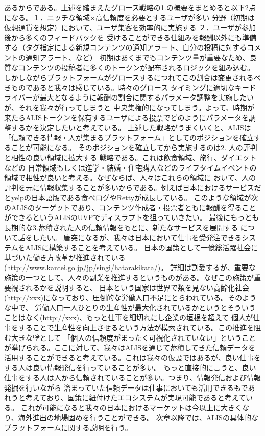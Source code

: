 \documentclass{jsarticle}
\begin{document}
あるからである。上述を踏まえたグロース戦略の1.の概要をまとめると以下2点になる。１．ニッチな領域×高信頼度を必要とするユーザが多い
分野（初期は仮想通貨を想定）において、ユーザ集客を効率的に実施する ２．ユーザが参加後から多くのフィードバックを
受けることができる仕組みを報酬以外にも準備する（タグ指定による新規コンテンツの通知アラート、自分の投稿に対するコメントの通知アラート、など）
初期はあくまでもコンテンツ量が重要なため、良質なコンテンツの投稿者に多くのトークンが配布されるロジックを組み込む。
しかしながらプラットフォームがグロースするにつれてこの割合は変更されるべきものであると我々は感じている。時々のグロース
タイミングに適切なキードライバーが最大となるように報酬の割合に関するパラメータ調整を実施したいが、それを我々が行ってしまうと
中央集権的になってしまう。よって、時期が来たらALISトークンを保有するユーザによる投票でどのようにパラメータを調整するかを決定したいと考えている。
上述した戦略がうまくいくと、ALISは「信頼できる情報・人が集まるプラットフォーム」としてのポジションを確立することが可能になる。
そのポジションを確立してから実施するのは2. 人の評判と相性の良い領域に拡大する 戦略である。これは飲食領域、旅行、ダイエットなどの
日常領域もしくは進学・結婚・住宅購入などのライフタイムイベントの領域で相性が良いと考える。なぜならば、人々はこれらの領域に
おいて、人の評判を元に情報収集することが多いからである。例えば日本におけるサービスだとyelpの日本語版である食べログやRettyが成長している。
このような領域が次のALISのターゲットであり、コンテンツ作成者・投票者ともに報酬を得ることができるというALISのUVPでディスラプトを狙っていきたい。
最後にもっとも長期的な3.蓄積された人の信頼情報をもとに、新たなサービスを展開する について話をしたい。
唐突になるが、我々は日本において仕事を受発注できるシステムをALISに構築することを考えている。
日本の国策として一億総活躍社会に基づいた働き方改革が推進されている(http://www.kantei.go.jp/jp/singi/hatarakikata/)。
詳細は割愛するが、重要な施策の一つとして、人々の副業を推進するというものがある。なぜこの施策が重要視されるかを説明すると、
日本という国家は世界で類を見ない高齢化社会(http://xxx)になっており、圧倒的な労働人口不足にとらわれている。そのような中で、
労働人口一人ひとりの生産性が最大化されているかというとそういうことはなく(http://xxx)、もっと仕事を細切れにし企業の垣根を超えて
個人が仕事をすることで生産性を向上させるという方法が模索されている。この推進を阻む大きな壁として
「個人の信頼度がまったく可視化されていない」ということが挙げられる。ここに対して、我々はALISを通じて蓄積してきた信頼データを
活用することができると考えている。これは我々の仮設ではあるが、良い仕事をする人は良い情報発信を行っていることが多い。
もっと直接的に言うと、良い仕事をする人は人から信頼されていることが多い。つまり、情報発信および情報発掘を行いながら
溜まっていた信頼データは仕事においても活用できるもであれうと考えており、国策に紐付けたエコシステムが実現可能であると考えている。
これが可能になると我々の日本におけるマーケットは今以上に大きくなり、海外進出の地場固めを行うことができる。
次章以降では、ALISの具体的なプラットフォームに関する説明を行う。
\end{document}
